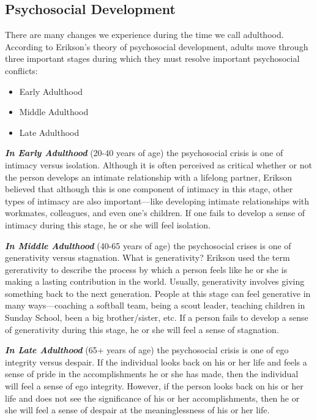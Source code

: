 \documentclass[
]{book}
\providecommand{\tightlist}{%
  \setlength{\itemsep}{0pt}\setlength{\parskip}{0pt}}
\begin{document}
\hypertarget{psychosocial-development}{%
\subsection*{Psychosocial Development}\label{psychosocial-development}}

There are many changes we experience during the time we call adulthood. According to Erikson's theory of psychosocial development, adults move through three important stages during which they must resolve important psychosocial conflicts:

\begin{itemize}
\tightlist
\item
  Early Adulthood\\
\item
  Middle Adulthood\\
\item
  Late Adulthood
\end{itemize}

\textbf{\emph{In Early Adulthood}} (20-40 years of age) the psychosocial crisis is one of intimacy versus isolation. Although it is often perceived as critical whether or not the person develops an intimate relationship with a lifelong partner, Erikson believed that although this is one component of intimacy in this stage, other types of intimacy are also important---like developing intimate relationships with workmates, colleagues, and even one's children. If one fails to develop a sense of intimacy during this stage, he or she will feel isolation.

\textbf{\emph{In Middle Adulthood}} (40-65 years of age) the psychosocial crises is one of generativity versus stagnation. What is generativity? Erikson used the term gererativity to describe the process by which a person feels like he or she is making a lasting contribution in the world. Usually, generativity involves giving something back to the next generation. People at this stage can feel generative in many ways---coaching a softball team, being a scout leader, teaching children in Sunday School, been a big brother/sister, etc. If a person fails to develop a sense of generativity during this stage, he or she will feel a sense of stagnation.

\textbf{\emph{In Late Adulthood}} (65+ years of age) the psychosocial crisis is one of ego integrity versus despair. If the individual looks back on his or her life and feels a sense of pride in the accomplishments he or she has made, then the individual will feel a sense of ego integrity. However, if the person looks back on his or her life and does not see the significance of his or her accomplishments, then he or she will feel a sense of despair at the meaninglessness of his or her life.
\end{document}
